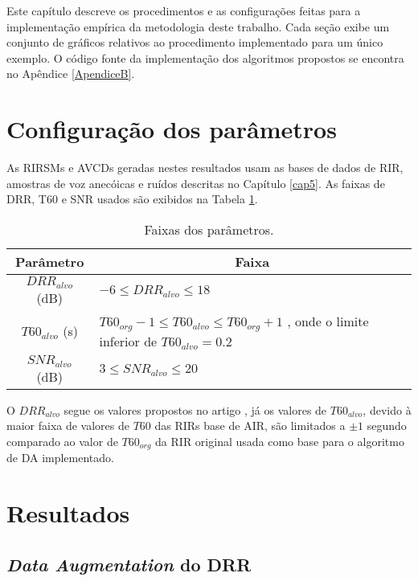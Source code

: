 Este capítulo descreve os procedimentos e as configurações feitas para a implementação empírica da metodologia deste trabalho.
Cada seção exibe um conjunto de gráficos relativos ao procedimento implementado para um único exemplo.
O código fonte da implementação dos algoritmos propostos se encontra no Apêndice \ref{ApendiceB}.

\section{Configuração dos parâmetros}

As RIRSMs e AVCDs geradas nestes resultados usam as bases de dados de RIR, amostras de voz anecóicas e ruídos descritas no Capítulo \ref{cap5}.
As faixas de DRR, T60 e SNR usados são exibidos na Tabela \ref{tbl:config-param}.

\begin{table} [H]
    \centering
    \caption{Faixas dos parâmetros.}
    \label{tbl:config-param}
    \begin{tabular}{c|p{9cm}}

        \multicolumn{1}{c|}{\textbf{Parâmetro}} & \multicolumn{1}{c}{\textbf{Faixa}} \\
        \hline 

        $DRR_{alvo}$ (dB) & $-6 \le DRR_{alvo} \le 18 $ \\
        $T60_{alvo}$ (s) & $T60_{org} - 1  \le T60_{alvo} \le T60_{org} + 1$ , onde o limite inferior de $T60_{alvo} = 0.2$ \\
        $SNR_{alvo}$ (dB) & $3 \le SNR_{alvo} \le 20 $ \\

    \end{tabular}
\end{table}

O $DRR_{alvo}$ segue os valores propostos no artigo \cite{RIR_Data_Aug}, já os valores de $T60_{alvo}$, devido à maior faixa de valores 
de $T60$ das RIRs base de AIR, são limitados a $\pm 1 $ segundo comparado ao valor de $T60_{org}$ da RIR original usada como base para o algoritmo
de DA implementado.

\section{Resultados}

\subsection{\textit{Data Augmentation} do DRR}

